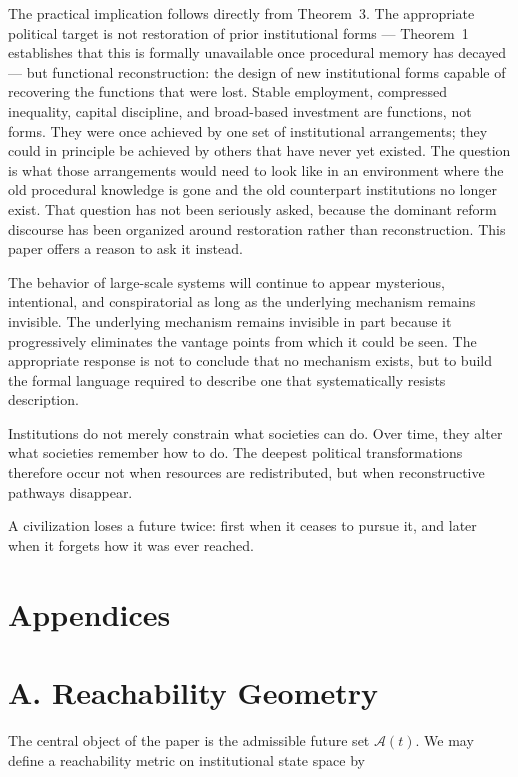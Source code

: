 \documentclass[12pt, a4paper]{article}
\theoremstyle{named}
\begin{document}
The practical implication follows directly from Theorem~3. The
appropriate political target is not restoration of prior institutional
forms — Theorem~1 establishes that this is formally unavailable once
procedural memory has decayed — but functional reconstruction: the
design of new institutional forms capable of recovering the functions
that were lost. Stable employment, compressed inequality, capital
discipline, and broad-based investment are functions, not forms. They
were once achieved by one set of institutional arrangements; they could
in principle be achieved by others that have never yet existed. The
question is what those arrangements would need to look like in an
environment where the old procedural knowledge is gone and the old
counterpart institutions no longer exist. That question has not been
seriously asked, because the dominant reform discourse has been
organized around restoration rather than reconstruction. This paper
offers a reason to ask it instead.

The behavior of large-scale systems will continue to appear mysterious,
intentional, and conspiratorial as long as the underlying mechanism
remains invisible. The underlying mechanism remains invisible in part
because it progressively eliminates the vantage points from which it
could be seen. The appropriate response is not to conclude that no
mechanism exists, but to build the formal language required to describe
one that systematically resists description.

\bigskip

Institutions do not merely constrain what societies can do. Over time,
they alter what societies remember how to do. The deepest political
transformations therefore occur not when resources are redistributed,
but when reconstructive pathways disappear.

A civilization loses a future twice: first when it ceases to pursue it,
and later when it forgets how it was ever reached.


\newpage 
\section*{Appendices}

\appendix

\section{A. Reachability Geometry}

The central object of the paper is the admissible future set
$\mathcal{A}(t)$. We may define a reachability metric on institutional
state space by
\end{document}
